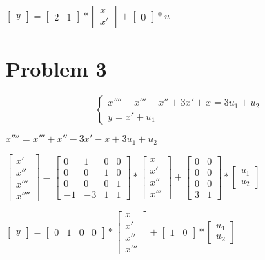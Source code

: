\documentclass[a4paper,11pt]{article}
\theoremstyle{mytheor}
\begin{document}
$ \begin{bmatrix}y\end{bmatrix} = \begin{bmatrix}2&1\end{bmatrix} * \begin{bmatrix}x\\x'\end{bmatrix} + \begin{bmatrix}0\end{bmatrix} * u$

\section*{Problem 3}

\begin{equation}
\begin{cases}
    x'''' - x''' - x'' +3x' +x = 3u_1 +u_2 \\ y=x' +u_1
\end{cases}
\end{equation}

$x'''' = x''' + x'' - 3x' - x + 3u_1 + u_2 $

$ \begin{bmatrix}x'\\x''\\x'''\\x''''\end{bmatrix} = \begin{bmatrix}0&1&0&0\\0&0&1&0\\0&0&0&1\\-1&-3&1&1\end{bmatrix} * \begin{bmatrix}x\\x'\\x''\\x'''\end{bmatrix}  + \begin{bmatrix}0&0\\0&0\\0&0\\3&1\end{bmatrix} * \begin{bmatrix}u_1\\u_2\end{bmatrix}$

$ \begin{bmatrix}y\end{bmatrix} = \begin{bmatrix}0&1&0&0\end{bmatrix} * \begin{bmatrix}x\\x'\\x''\\x'''\end{bmatrix} + \begin{bmatrix}1&0\end{bmatrix} * \begin{bmatrix}u_1\\u_2\end{bmatrix}$
\end{document}

